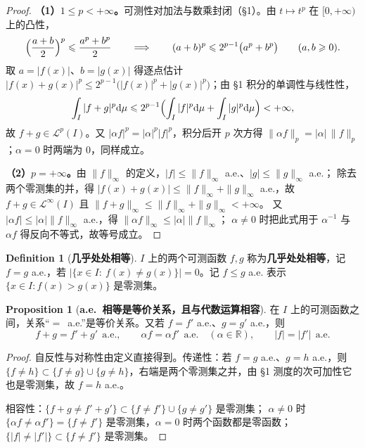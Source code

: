 \documentclass[oneside]{book}
\theoremstyle{definition}
\newcommand{\R}{\mathbb{R}}
\newcommand{\dd}{\mathrm{d}}
\theoremstyle{definition}
\newtheorem{proposition}{Proposition}[section]
\newtheorem{definition}{Definition}[section]
\begin{document}
	\begin{proof}
		\textbf{（1）$1\leqslant p<+\infty$。}可测性对加法与数乘封闭（§1）。由 $t\mapsto t^p$ 在 $[0,+\infty)$ 上的凸性，
		\[
		\Bigl(\frac{a+b}2\Bigr)^p\leqslant\frac{a^p+b^p}2
		\qquad\Longrightarrow\qquad
		(a+b)^p\leqslant2^{p-1}\bigl(a^p+b^p\bigr)\qquad(a,b\geqslant0).
		\]
		取 $a=|f(x)|$、$b=|g(x)|$ 得逐点估计
		$|f(x)+g(x)|^p\leqslant2^{p-1}\bigl(|f(x)|^p+|g(x)|^p\bigr)$；由 §1 积分的单调性与线性性，
		\[
		\int_I|f+g|^p\dd\mu\leqslant2^{p-1}\Bigl(\int_I|f|^p\dd\mu+\int_I|g|^p\dd\mu\Bigr)<+\infty,
		\]
		故 $f+g\in\mathcal L^p(I)$。又 $|\alpha f|^p=|\alpha|^p|f|^p$，积分后开 $p$ 次方得
		$\|\alpha f\|_p=|\alpha|\,\|f\|_p$；$\alpha=0$ 时两端为 $0$，同样成立。
		
		\textbf{（2）$p=+\infty$。}由 $\|f\|_\infty$ 的定义，$|f|\leqslant\|f\|_\infty$ a.e.、$|g|\leqslant\|g\|_\infty$ a.e.；
		除去两个零测集的并，得
		$|f(x)+g(x)|\leqslant\|f\|_\infty+\|g\|_\infty$ a.e.，故 $f+g\in\mathcal L^\infty(I)$ 且
		$\|f+g\|_\infty\leqslant\|f\|_\infty+\|g\|_\infty<+\infty$。
		又 $|\alpha f|\leqslant|\alpha|\|f\|_\infty$ a.e.，得 $\|\alpha f\|_\infty\leqslant|\alpha|\|f\|_\infty$；
		$\alpha\ne0$ 时把此式用于 $\alpha^{-1}$ 与 $\alpha f$ 得反向不等式，故等号成立。
	\end{proof}
	
	\begin{definition}[\bfseries{几乎处处相等}]
		$I$ 上的两个可测函数 $f,g$ 称为\textbf{几乎处处相等}，记 $f=g$ a.e.，若
		$\bigl|\{x\in I:\ f(x)\ne g(x)\}\bigr|=0$。记 $f\leqslant g$ a.e. 表示 $\{x\in I: f(x)>g(x)\}$ 是零测集。
	\end{definition}
	
	\begin{proposition}[\bfseries{a.e.\ 相等是等价关系，且与代数运算相容}]
		在 $I$ 上的可测函数之间，关系“$=$\ a.e.”是等价关系。又若 $f=f'$ a.e.、$g=g'$ a.e.，则
		\[
		f+g=f'+g'\ \ \text{a.e.},\qquad \alpha f=\alpha f'\ \ \text{a.e.}\quad(\alpha\in\R),\qquad
		|f|=|f'|\ \ \text{a.e.}
		\]
	\end{proposition}
	
	\begin{proof}
		自反性与对称性由定义直接得到。传递性：若 $f=g$ a.e.、$g=h$ a.e.，则
		$\{f\ne h\}\subset\{f\ne g\}\cup\{g\ne h\}$，右端是两个零测集之并，由 §1 测度的次可加性它也是零测集，故 $f=h$ a.e.。
		
		相容性：$\{f+g\ne f'+g'\}\subset\{f\ne f'\}\cup\{g\ne g'\}$ 是零测集；
		$\alpha\ne0$ 时 $\{\alpha f\ne\alpha f'\}=\{f\ne f'\}$ 是零测集，$\alpha=0$ 时两个函数都是零函数；
		$\{|f|\ne|f'|\}\subset\{f\ne f'\}$ 是零测集。
	\end{proof}
	
\end{document}
